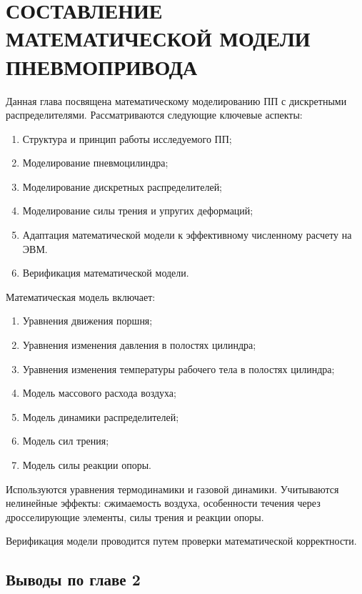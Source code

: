 \chapter{СОСТАВЛЕНИЕ МАТЕМАТИЧЕСКОЙ МОДЕЛИ ПНЕВМОПРИВОДА}\label{ch:ch2}
Данная глава посвящена математическому моделированию ПП
с дискретными распределителями. Рассматриваются следующие ключевые аспекты:

\begin{enumerate}
    \item Структура и принцип работы исследуемого ПП;
    \item Моделирование пневмоцилиндра;
    \item Моделирование дискретных распределителей;
    \item Моделирование силы трения и упругих деформаций;
    \item Адаптация математической модели к эффективному численному расчету на ЭВМ.
    \item Верификация математической модели.
\end{enumerate}

Математическая модель включает:

\begin{enumerate}
    \item Уравнения движения поршня;
    \item Уравнения изменения давления в полостях цилиндра;
    \item Уравнения изменения температуры рабочего тела в полостях цилиндра;
    \item Модель массового расхода воздуха;
    \item Модель динамики распределителей;
    \item Модель сил трения;
    \item Модель силы реакции опоры.
\end{enumerate}

Используются уравнения термодинамики и газовой динамики. Учитываются нелинейные эффекты:
сжимаемость воздуха, особенности течения через дросселирующие элементы, силы трения и реакции опоры.

Верификация модели проводится путем проверки математической корректности.








\section{Выводы по главе 2}

